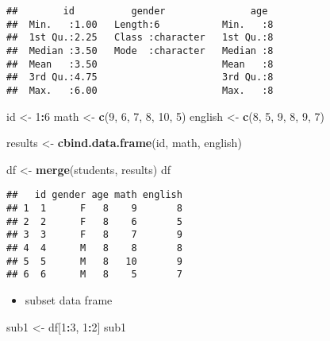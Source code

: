 \documentclass[
  a4paper,
]{article}
\newenvironment{Shaded}{\begin{snugshade}}{\end{snugshade}}
\newcommand{\DecValTok}[1]{\textcolor[rgb]{0.00,0.00,0.81}{#1}}
\newcommand{\FunctionTok}[1]{\textcolor[rgb]{0.13,0.29,0.53}{\textbf{#1}}}
\newcommand{\NormalTok}[1]{#1}
\newcommand{\OtherTok}[1]{\textcolor[rgb]{0.56,0.35,0.01}{#1}}
\newcommand{\SpecialCharTok}[1]{\textcolor[rgb]{0.81,0.36,0.00}{\textbf{#1}}}
\providecommand{\tightlist}{%
  \setlength{\itemsep}{0pt}\setlength{\parskip}{0pt}}
\begin{document}
\begin{verbatim}
##        id          gender               age   
##  Min.   :1.00   Length:6           Min.   :8  
##  1st Qu.:2.25   Class :character   1st Qu.:8  
##  Median :3.50   Mode  :character   Median :8  
##  Mean   :3.50                      Mean   :8  
##  3rd Qu.:4.75                      3rd Qu.:8  
##  Max.   :6.00                      Max.   :8
\end{verbatim}

\begin{Shaded}
\begin{Highlighting}[]
\NormalTok{id }\OtherTok{\textless{}{-}} \DecValTok{1}\SpecialCharTok{:}\DecValTok{6}
\NormalTok{math }\OtherTok{\textless{}{-}} \FunctionTok{c}\NormalTok{(}\DecValTok{9}\NormalTok{, }\DecValTok{6}\NormalTok{, }\DecValTok{7}\NormalTok{, }\DecValTok{8}\NormalTok{, }\DecValTok{10}\NormalTok{, }\DecValTok{5}\NormalTok{)}
\NormalTok{english }\OtherTok{\textless{}{-}} \FunctionTok{c}\NormalTok{(}\DecValTok{8}\NormalTok{, }\DecValTok{5}\NormalTok{, }\DecValTok{9}\NormalTok{, }\DecValTok{8}\NormalTok{, }\DecValTok{9}\NormalTok{, }\DecValTok{7}\NormalTok{)}

\NormalTok{results }\OtherTok{\textless{}{-}} \FunctionTok{cbind.data.frame}\NormalTok{(id, math, english)}

\NormalTok{df }\OtherTok{\textless{}{-}} \FunctionTok{merge}\NormalTok{(students, results)}
\NormalTok{df}
\end{Highlighting}
\end{Shaded}

\begin{verbatim}
##   id gender age math english
## 1  1      F   8    9       8
## 2  2      F   8    6       5
## 3  3      F   8    7       9
## 4  4      M   8    8       8
## 5  5      M   8   10       9
## 6  6      M   8    5       7
\end{verbatim}

\begin{itemize}
\tightlist
\item
  subset data frame
\end{itemize}

\begin{Shaded}
\begin{Highlighting}[]
\NormalTok{sub1 }\OtherTok{\textless{}{-}}\NormalTok{ df[}\DecValTok{1}\SpecialCharTok{:}\DecValTok{3}\NormalTok{, }\DecValTok{1}\SpecialCharTok{:}\DecValTok{2}\NormalTok{]}
\NormalTok{sub1}
\end{Highlighting}
\end{Shaded}
\end{document}
